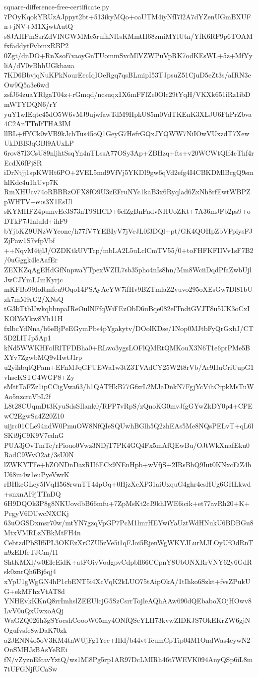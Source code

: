 \documentclass[11pt]{article}
\theoremstyle{definition}
\theoremstyle{remark}
\begin{document}
\begin{filecontents*}[overwrite]{square-difference-free-certificate.py}
7POyKqokYRUzAJppyt2bt+513ikyMQo+oaUTM4iyNfI7l2A7dYZenUGmBXUFn+jNV+M1XjwtAutQ
s8JAHPmSsrZdVlNGWMMe5rufhNl1sKMmtH68zmiMYlUtn/YfK6RF9p6TOAMfxfaddytFvbmxRBP2
0Zgt/dnDO+RnXsof7vaoyGnTUommSvcMlVZWPuVpRK7odKEsWL+5z+MfYyliA/dV0vBhhUGkbaua
7KD6BbvjqNuKPkNourEecIqIOeRgq7qsBLmipI53TJpsuZ51CjuD5eZt3s/aIRN3eOw9Q5a3e6wd
zsfJ64zuaYRlgaT04z+rGmqd/ncsuqx1X6mFFlZe0Olc29tYqH/VKXk651iRz1ibDmWTYDQN6/rY
yuY1wIEqtc45dO5W6vMJ9ujwfawTdM9HpkU85m0VdTKEnK3XLJU6FhPrZbva4C2AnTTnIfTHA3IM
llBL+ffYCk0vVB9kJcbTus45oQ1GeyG7HefrGQxJYQWW7NiIOwVUxzdT7XewUkDBB3qGBl9AUxLP
6rov87I3CsU89nljhtSsqYn4nTLssA77OSy3Ap+ZBHzq+fts+v20WCWtQIf4cThf4rEcdX6fFj8R
iDrNtjj1spKWHt6PO+2VEL5md9VfVj5YKDI9gw6qVd2efg4I4CBKDMlBcgQ9smhlKdc4u1hUvp7K
RmXHUcv74oRBBRzOFX8fO9U3zEFruNYc1kaB3x6Ryqlad6ZxNh8rfEwtWBPZpWHTV+eus3X1EsUl
sKYMHFZ4pumvEc3S73nT9SHCD+6elZgBnFndvNHUoZKt+7A36mJFb2ps9+oDTkP7JInluId+ihF9
bYjbKZ9UNzWYeone/h77fV7YEBIyV7jVeJL0f3DQl+pt/GK4QOHpZbVFpiysFJZjPaw1S7vfpVbf
++NqvM4tjlJ/OZDKtkUVTcp/mbLA2L5uLclCmTV55/0+toFHFKFIIVv1sF7B2/0uGggk4leAafEr
ZEXKZqAgEHdGfNnpwaYTpexWZIL7sb35pho4nIs8hn/Mm8WciiDqdPfaZwbUjlJwCJYmLJmKyrjc
mKFBo99IoRmfeu9Oqo14PSAyAcYW7ifHv9BZTmlaZ2vuvo295oXEsGw7Dl81bUzk7mM9rG2/XNsQ
tG3bTtbUwkqbbnpaIReOulNFfqWiFEzObD6uBqe082eITndtGVJT8u5UK3oCxIKOlYsYkw8Yh11H
fxlbcYdNna/b6eBjPeEGymPbs4pYgakytv/DOolKDse/1Nop0MJtbFyQrGxbJ/CT5D2LlTJp5Ap1
kNd5WWKHFolRlTFDBha0+RLwo3ygsLOFlQMRtQMKouX3N6T1e6prPMe5BXYv7ZgwbMQ9vHwtJIrp
u2yihbqtQPam+EFnMJqGFUEWa1w3tZ3TVAdCY25W2t8rVb/Ac9HuCriUupG1vhscKSTG4WGP8+Zy
sMttTaFZz1ipCCigVwa63/h1QATHkB77GfzrL2MJaDnkN7FgjYcVihCrpkMsTuWAo5nzcrcVbL2f
L8t28CUqmDt3KyuSdsSIlank0/RFP7vRpS/zQnoKG0mvJfgGYwZkDY0p4+CPEwC2EgwSa4Z20Z10
uijrc01CLe94ndW0PmuOW8NfQIeSQUwhBGlh5Q2zhEAs5Me8NQsPELvT+qL6lSKt9jC9K9V7cdnG
PUA3jOvTmTc/rPiouo0Vwz3NDjT7PK4GQ4Fx5mAfQEwBu/OJtWkXnafEku0RadC9WvO2at/3sU0N
lZWKYTFe+bZONDnDazRII6ECx9NEnHpb+wVfjS+2IRsBhQ9Iut0KNxcEiZ4hU68m4w1euPyeVwrK
rBHkcGLey5lVqH568rwnTT44pOq+0HjzXcXP31aiUxquG4ghr4csHUg6GHLkwd+snxnAI9jTTnDQ
6H9DQOk3P8g8NKUovdbB66mfu+7ZpMsKt2cJ9khIWE6icik+et77avRh20+K+PcgyV6DUwcNXCKj
63uOGSDxmsr70w/mtYN7gzqVpGP7PcM1lmrHEYwiYaUztWdHNukU6BDBGu8MtxVMRLzNBkMtFH4n
CebtzdPbSIf5PL3OKEzXrCZU5zVe5i1qFJoi5RjenWgWKYJLurMJLOyUfOdRnTn9zEDfeTJCm/I1
ShtKMXl/w0EIeEidK+atFOivVodgpvCdpbll66CCpnY8UbONXRrVNY62y6GdRsk0znrQh6Bj6qj4
xYpU1gWgGN4hP1cbENT5i4XcVqK2kLUO75tAipOkA/1tIhko6Szkt+fvsZPukUG+ekMFhxVtAT8d
YNHEvkKKnQ8rrImhslZEEUlcjG5SzCsrrTojleAQhAAw690dQEbaboXOjHOwv8LvV0uQxUwxoAQj
WaGZQ026h3gSYocshCoooW05my4ONfQScYLH73kvwZIDKJS7OkEKrZW6gjNOgufvsfe8wDaK70zk
a2JENN4o5oV3KM4tnWUjFg1Yec+Hld/b44vtTeumCpTip04M1OndWas4eywN2OnSMHJsBAsYeREi
fN/vZyznEfcavYztQ/ws1Ml8Pg5rp1AR97DcLMIRh46t7WEVK094AnyQSp6iL8m7tUFGNjfUCaSw

\end{filecontents*}
\end{document}
